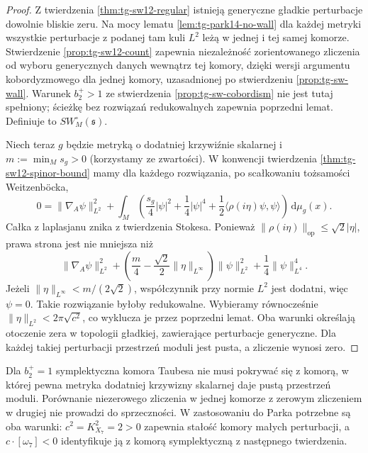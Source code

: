 \begin{proof}
Z twierdzenia \ref{thm:tg-sw12-regular} istnieją
generyczne gładkie perturbacje dowolnie bliskie zeru.
Na mocy lematu \ref{lem:tg-park14-no-wall}
dla każdej metryki wszystkie perturbacje z podanej
tam kuli $L^2$ leżą w jednej i tej samej komorze.
Stwierdzenie \ref{prop:tg-sw12-count} zapewnia
niezależność zorientowanego zliczenia od wyboru
generycznych danych wewnątrz tej komory, dzięki
wersji argumentu kobordyzmowego dla jednej komory,
uzasadnionej po stwierdzeniu \ref{prop:tg-sw-wall}.
Warunek $b_2^+>1$ ze stwierdzenia
\ref{prop:tg-sw-cobordism} nie jest tutaj spełniony;
ścieżkę bez rozwiązań redukowalnych zapewnia
poprzedni lemat. Definiuje to
$SW_M^\circ(\mathfrak s)$.

Niech teraz $g$ będzie metryką o dodatniej krzywiźnie
skalarnej i $m:=\min_M s_g>0$ (korzystamy ze zwartości).
W konwencji twierdzenia \ref{thm:tg-sw12-spinor-bound}
mamy dla każdego rozwiązania, po scałkowaniu
tożsamości Weitzenböcka,
\[
0=\|\nabla_A\psi\|_{L^2}^2
+\int_M\left(\frac{s_g}{4}|\psi|^2
+\frac14|\psi|^4
+\frac12\langle\rho(i\eta)\psi,\psi\rangle\right)
\,\mathrm d\mu_g(x).
\]
Całka z laplasjanu znika z twierdzenia Stokesa.
Ponieważ $\|\rho(i\eta)\|_{\mathrm{op}}\le\sqrt2|\eta|$,
prawa strona jest nie mniejsza niż
\[
\|\nabla_A\psi\|_{L^2}^2+
\left(\frac m4-\frac{\sqrt2}{2}\|\eta\|_{L^\infty}\right)
\|\psi\|_{L^2}^2+\frac14\|\psi\|_{L^4}^4.
\]
Jeżeli $\|\eta\|_{L^\infty}<m/(2\sqrt2)$,
współczynnik przy normie $L^2$ jest dodatni,
więc $\psi=0$. Takie rozwiązanie byłoby
redukowalne. Wybieramy równocześnie
$\|\eta\|_{L^2}<2\pi\sqrt{c^2}$, co wyklucza
je przez poprzedni lemat. Oba warunki określają
otoczenie zera w topologii gładkiej, zawierające
perturbacje generyczne. Dla każdej takiej perturbacji
przestrzeń moduli jest pusta, a zliczenie wynosi zero.
\end{proof}

\begin{uwaga}
Dla $b_2^+=1$ symplektyczna komora Taubesa nie musi
pokrywać się z komorą, w której pewna metryka dodatniej
krzywizny skalarnej daje pustą przestrzeń moduli.
Porównanie niezerowego zliczenia w jednej komorze
z zerowym zliczeniem w drugiej nie prowadzi do sprzeczności.
W zastosowaniu do Parka potrzebne są oba warunki:
$c^2=K_{X_7}^2=2>0$ zapewnia stałość komory małych
perturbacji, a $c\cdot[\omega_7]<0$ identyfikuje
ją z komorą symplektyczną z następnego twierdzenia.
\end{uwaga}

